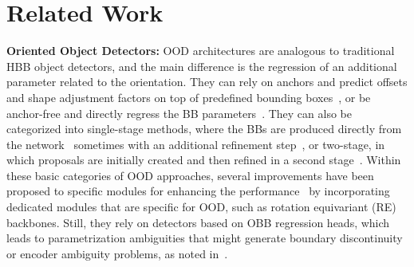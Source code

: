 \section{Related Work}
\noindent
\textbf{Oriented Object Detectors:} OOD architectures are analogous to traditional HBB object detectors, and the main difference is the regression of an additional parameter related to the orientation. They can rely on anchors and predict offsets and shape adjustment factors on top of predefined bounding boxes~\cite{lin2017retinanet}, or be anchor-free and directly regress the BB parameters~\citep{tian2019fcos,zhou2019objects,lang2021dafne}. They can also be categorized into single-stage methods, where the BBs are produced directly from the network~\cite{lin2017retinanet,tian2019fcos} sometimes with an additional refinement step~\cite{Xue2021r3det}, or two-stage, in which proposals are initially created and then refined in a second stage~\cite{ding2019roitransformer,han2021redet,xie2024orcnn_beyond}. Within these basic categories of OOD approaches, several improvements have been proposed to specific modules for enhancing the performance~\cite{han2021redet, ming2021cfc, han2022s2anet, xie2024orcnn_beyond, ming2023tioe, qiao2023grg,lee2024fred} by incorporating dedicated modules that are specific for OOD, such as rotation equivariant (RE) backbones. Still, they rely on detectors based on OBB regression heads, which leads to parametrization ambiguities that might generate boundary discontinuity or encoder ambiguity problems, as noted in~\cite{xiao2024theoretically}. 


